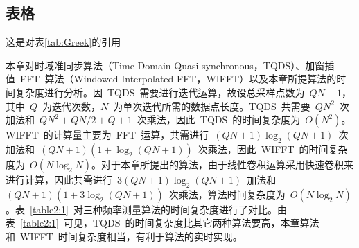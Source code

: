 \subsection{表格}
\begin{table}[htbp]
    \begin{center}
        \caption{希腊字母表\label{tab:Greek}}
    \end{center}
\end{table}
这是对表\ref{tab:Greek}的引用

\begin{table}[htbp]
    \caption{不同电力系统频率测量算法时间复杂度比较}\label{table2:1}
    \vspace{0.5em}\centering{}
    \vspace{\baselineskip}
\end{table}

本章对时域准同步算法（Time Domain Quasi-synchronous，TQDS）、加窗插值~FFT~算法（Windowed Interpolated FFT，WIFFT）以及本章所提算法的时间复杂度进行分析。因~TQDS~需要进行迭代运算，故设总采样点数为~$QN+1$，其中~$Q$~为迭代次数，$N$~为单次迭代所需的数据点长度。TQDS~共需要~$QN^2$~次加法和~$QN^2+QN/2+Q+1$~次乘法，因此~TQDS~的时间复杂度为~$O(N^2)$。WIFFT~的计算量主要为~FFT~运算，共需进行~$(QN+1)\log_2(QN+1)$~次加法和~$(QN+1)(1+\log_2(QN+1))$~次乘法，因此~WIFFT~的时间复杂度为~$O(N\log_2N)$。对于本章所提出的算法，由于线性卷积运算采用快速卷积来进行计算，因此共需进行~$3(QN+1)\log_2(QN+1)$~加法和~$(QN+1)(1+3\log_2(QN+1))$~次乘法，算法时间复杂度为~$O(N\log_2N)$。表~\ref{table2:1}~对三种频率测量算法的时间复杂度进行了对比。由表~\ref{table2:1}~可见，TQDS~的时间复杂度比其它两种算法要高，本章算法和~WIFFT~时间复杂度相当，有利于算法的实时实现。
